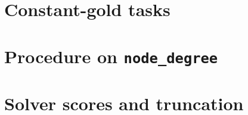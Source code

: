 \documentclass[11pt]{article}
\begin{document}
\section{Constant-gold tasks}
\label{sec:appendix-constgold}



\section{Procedure on \texttt{node\_degree}}
\label{sec:appendix-routes}



\section{Solver scores and truncation}
\label{sec:appendix-solver}

\begin{table}[H]
\centering
\small
\setlength{\tabcolsep}{3.2pt}
\caption{Accuracy (\%) of the graph-blind solver at $n{=}40$, averaged over
seven densities ($300$ test graphs per density; fitted rules use separate
graphs). It reads the rendered primer and the node and edge counts, except the
count a task asks for, never the edge list. \textbf{Bold}: answer-carrying (at
least $85\%$) on a task whose gold varies. On \texttt{node\_count} and
\texttt{cycle\_check} every score is $100$ because the gold answer is constant
at $n{=}40$. On \texttt{edge\_existence}, \texttt{rwse} scores below
\texttt{none}: from $p{=}.65$ its fitted density rule is less accurate than
the majority answer, on the fitting graphs as well.}
\label{tab:shortcut}
\end{table}
\end{document}
